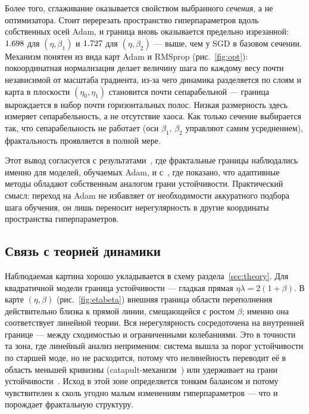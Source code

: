 Более того, сглаживание оказывается свойством выбранного \emph{сечения}, а не
оптимизатора. Стоит перерезать пространство гиперпараметров вдоль собственных
осей Adam, и граница вновь оказывается предельно изрезанной: $1.698$ для
$(\eta,\beta_1)$ и $1.727$ для $(\eta,\beta_2)$ --- выше, чем у SGD в
базовом сечении. Механизм понятен из вида карт Adam и RMSprop
(рис.~\ref{fig:opt}): покоординатная нормализация делает величину шага по
каждому весу почти независимой от масштаба градиента, из-за чего динамика
разделяется по слоям и карта в плоскости $(\eta_0,\eta_1)$ становится почти
сепарабельной --- граница вырождается в набор почти горизонтальных полос.
Низкая размерность здесь измеряет сепарабельность, а не отсутствие хаоса.
Как только сечение выбирается так, что сепарабельность не работает
(оси $\beta_1$, $\beta_2$ управляют самим усреднением), фрактальность
проявляется в полной мере.

Этот вывод согласуется с результатами~\cite{torkamandi2025}, где фрактальные
границы наблюдались именно для моделей, обучаемых Adam, и
с~\cite{cohen2022}, где показано, что адаптивные методы обладают собственным
аналогом грани устойчивости. Практический смысл: переход на Adam не избавляет
от необходимости аккуратного подбора шага обучения, он лишь переносит
нерегулярность в другие координаты пространства гиперпараметров.

\subsection{Связь с теорией динамики}

Наблюдаемая картина хорошо укладывается в схему раздела~\ref{sec:theory}.
Для квадратичной модели граница устойчивости --- гладкая прямая
$\eta\lambda = 2(1+\beta)$. В карте $(\eta,\beta)$ (рис.~\ref{fig:etabeta})
внешняя граница области переполнения действительно близка к прямой линии,
смещающейся с ростом $\beta$; именно она соответствует линейной теории.
Вся нерегулярность сосредоточена на внутренней границе --- между сходимостью
и ограниченными колебаниями. Это в точности та зона, где линейный анализ
неприменим: система вышла за порог устойчивости по старшей моде, но не
расходится, потому что нелинейность переводит её в область меньшей
кривизны (catapult-механизм~\cite{lewkowycz2020}) или удерживает на грани
устойчивости~\cite{cohen2021}. Исход в этой зоне определяется тонким балансом
и потому чувствителен к сколь угодно малым изменениям гиперпараметров ---
что и порождает фрактальную структуру.

